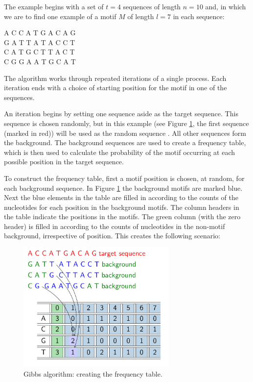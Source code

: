 \documentclass[12pt]{article}
\begin{document}
The example begins with a set of  $t=4$ sequences of length $n=10$ and, in which we are to find one example of a motif $M$ of length $l=7$ in each sequence:
\begin{center}
A  C  C  A  T  G  A  C  A  G\\
G  A  T  T  A  T  A  C  C  T\\
C  A  T  G  C  T  T  A  C  T\\
C  G  G  A  A  T  G  C  A  T\\
\end{center}
The algorithm works through repeated iterations of a single process. Each iteration ends with a choice of starting position for the motif in one of the sequences.

An iteration begins by setting one sequence aside as the target sequence. This sequence is chosen randomly, but in this example (see Figure \ref{gibbs1}, the first sequence (marked in red)) will be used as the random sequence . All other sequences form the background. The background sequences are used to create a frequency table, which is then used to calculate the probability of the motif occurring at each possible position in the target sequence.

To construct the frequency table, first a motif position is chosen, at random, for each background sequence. In Figure \ref{gibbs1} the background motifs are marked blue. Next the blue elements in the table are filled in according to the counts of the nucleotides for each position in the background motifs. The column headers in the table indicate the positions in the motifs. The green column (with the zero header) is filled in according to the counts of nucleotides in the non-motif background, irrespective of position. This creates the following scenario:

\begin{figure}[!htbp]
\centering
\includegraphics[width=0.7\textwidth]{GibbsTable.png}
\caption{Gibbs algorithm: creating the frequency table.}\label{gibbs1}
\end{figure}
\end{document}
